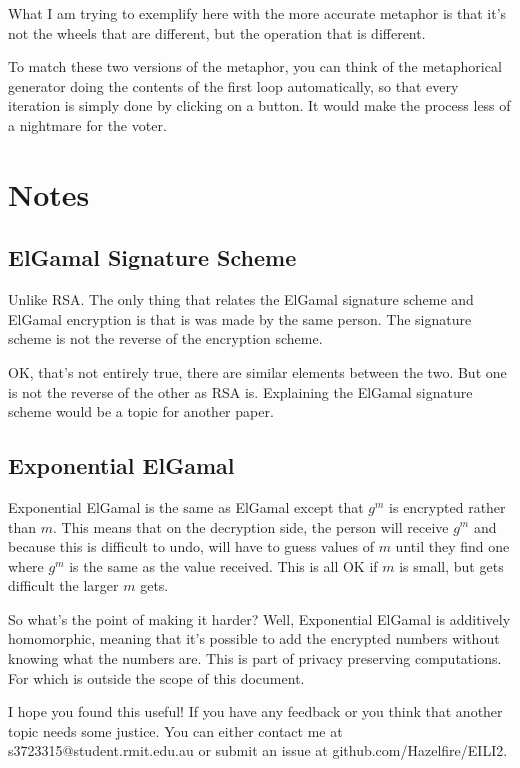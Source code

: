 \documentclass{article}
\begin{document}
  What I am trying to exemplify here with the more accurate metaphor is that
  it's not the wheels that are different, but the operation that is different.

  To match these two versions of the metaphor, you can think of the metaphorical
  generator doing the contents of the first loop automatically, so that every
  iteration is simply done by clicking on a button. It would make the process
  less of a nightmare for the voter.

  \section*{Notes}
  \subsection*{ElGamal Signature Scheme}
  Unlike RSA. The only thing that relates the ElGamal signature scheme and
  ElGamal encryption is that is was made by the same person. The signature
  scheme is not the reverse of the encryption scheme.

  OK, that's not entirely true, there are similar elements between the two.
  But one is not the reverse of the other as RSA is. Explaining the ElGamal
  signature scheme would be a topic for another paper.

  \subsection*{Exponential ElGamal}
  Exponential ElGamal is the same as ElGamal except that $g^m$ is encrypted
  rather than $m$. This means that on the decryption side, the person will receive
  $g^m$ and because this is difficult to undo, will have to guess values of $m$ until
  they find one where $g^m$ is the same as the value received. This is all OK if $m$
  is small, but gets difficult the larger $m$ gets.

  So what's the point of making it harder? Well, Exponential ElGamal is additively
  homomorphic, meaning that it's possible to add the encrypted numbers without
  knowing what the numbers are. This is part of privacy preserving computations.
  For which is outside the scope of this document.

  I hope you found this useful! If you have any feedback or you think that another
  topic needs some justice. You can either contact me at s3723315@student.rmit.edu.au
  or submit an issue at github.com/Hazelfire/EILI2.
\end{document}

